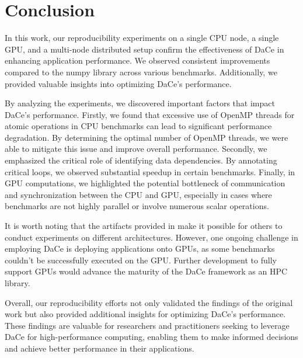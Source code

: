 \section{Conclusion}
\label{sec:conc}
In this work, our reproducibility experiments on a single CPU node, a single GPU, and a multi-node distributed setup confirm the effectiveness of DaCe in enhancing application performance. 
We observed consistent improvements compared to the numpy library across various benchmarks. Additionally, we provided valuable insights into optimizing DaCe's performance.

By analyzing the experiments, we discovered important factors that impact DaCe's performance. Firstly, we found that excessive use of OpenMP threads for atomic operations in CPU benchmarks can lead to significant performance degradation. By determining the optimal number of OpenMP threads, we were able to mitigate this issue and improve overall performance. Secondly, we emphasized the critical role of identifying data dependencies. By annotating critical loops, we observed substantial speedup in certain benchmarks. Finally, in GPU computations, we highlighted the potential bottleneck of communication and synchronization between the CPU and GPU, especially in cases where benchmarks are not highly parallel or involve numerous scalar operations.

It is worth noting that the artifacts provided in \cite{dace2021} make it possible for others to conduct experiments on different architectures. However, one ongoing challenge in employing DaCe is deploying applications onto GPUs, as some benchmarks couldn't be successfully executed on the GPU. Further development to fully support GPUs would advance the maturity of the DaCe framework as an HPC library.

Overall, our reproducibility efforts not only validated the findings of the original work but also provided additional insights for optimizing DaCe's performance. These findings are valuable for researchers and practitioners seeking to leverage DaCe for high-performance computing, enabling them to make informed decisions and achieve better performance in their applications. 